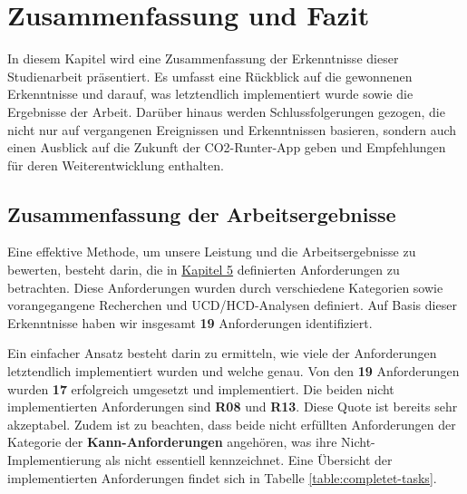
\chapter{Zusammenfassung und Fazit }
\label{chapter:7}

In diesem Kapitel wird eine Zusammenfassung der Erkenntnisse dieser Studienarbeit präsentiert. Es umfasst eine Rückblick auf die gewonnenen Erkenntnisse und darauf, was letztendlich implementiert wurde sowie die Ergebnisse der Arbeit. Darüber hinaus werden Schlussfolgerungen gezogen, die nicht nur auf vergangenen Ereignissen und Erkenntnissen basieren, sondern auch einen Ausblick auf die Zukunft der CO2-Runter-App geben und Empfehlungen für deren Weiterentwicklung enthalten.

\section{Zusammenfassung der Arbeitsergebnisse}

Eine effektive Methode, um unsere Leistung und die Arbeitsergebnisse zu bewerten, besteht darin, die in \hyperref[chapter:5]{Kapitel 5} definierten Anforderungen zu betrachten. Diese Anforderungen wurden durch verschiedene Kategorien sowie vorangegangene Recherchen und \acs{UCD}/\acs{HCD}-Analysen definiert. Auf Basis dieser Erkenntnisse haben wir insgesamt \textbf{19} Anforderungen identifiziert.

Ein einfacher Ansatz besteht darin zu ermitteln, wie viele der Anforderungen letztendlich implementiert wurden und welche genau. Von den \textbf{19} Anforderungen wurden \textbf{17} erfolgreich umgesetzt und implementiert. Die beiden nicht implementierten Anforderungen sind \textbf{R08} und \textbf{R13}. Diese Quote ist bereits sehr akzeptabel. Zudem ist zu beachten, dass beide nicht erfüllten Anforderungen der Kategorie der \textbf{Kann-Anforderungen} angehören, was ihre Nicht-Implementierung als nicht essentiell kennzeichnet. Eine Übersicht der implementierten Anforderungen findet sich in Tabelle \ref{table:completet-tasks}.

